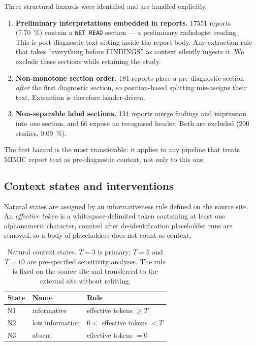 Three structural hazards were identified and are handled explicitly.

\begin{enumerate}
  \item \textbf{Preliminary interpretations embedded in reports.}
    \num{17551} reports (\SI{7.70}{\percent}) contain a \texttt{WET READ}
    section --- a preliminary radiologist reading. This is post-diagnostic text
    sitting inside the report body. Any extraction rule that takes ``everything
    before FINDINGS'' as context silently ingests it. We exclude these sections
    while retaining the study.
  \item \textbf{Non-monotone section order.} \num{181} reports place a
    pre-diagnostic section \emph{after} the first diagnostic section, so
    position-based splitting mis-assigns their text. Extraction is therefore
    header-driven.
  \item \textbf{Non-separable label sections.} \num{134} reports merge findings
    and impression into one section, and \num{66} expose no recognised header.
    Both are excluded (\num{200} studies, \SI{0.09}{\percent}).
\end{enumerate}

The first hazard is the most transferable: it applies to any pipeline that
treats MIMIC report text as pre-diagnostic context, not only to this one.

\subsection{Context states and interventions}

Natural states are assigned by an informativeness rule defined on the source
site. An \emph{effective token} is a whitespace-delimited token containing at
least one alphanumeric character, counted after de-identification placeholder
runs are removed, so a body of placeholders does not count as context.

\begin{table}[htbp]
\centering
\caption{Natural context states. $T=3$ is primary; $T=5$ and $T=10$ are
pre-specified sensitivity analyses. The rule is fixed on the source site and
transferred to the external site without refitting.}
\label{tab:states}
\begin{tabular}{lll}
\toprule
State & Name & Rule \\
\midrule
N1 & informative      & effective tokens $\geq T$ \\
N2 & low information  & $0 <$ effective tokens $< T$ \\
N3 & absent           & effective tokens $= 0$ \\
\bottomrule
\end{tabular}
\end{table}

